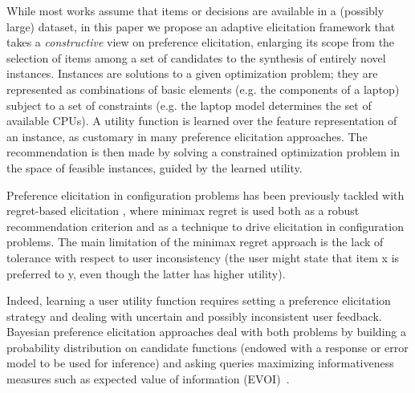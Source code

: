 \documentclass{article}
\renewcommand\[{\begin{equation}}
\renewcommand\]{\end{equation}}
\begin{document}


While most works assume that items or decisions are available in a (possibly large)
dataset, in this paper we propose an adaptive elicitation framework that takes a {\em constructive} view on preference
elicitation, enlarging its scope from the selection of items among a
set of candidates to the synthesis of entirely novel instances. 
Instances are solutions to a given optimization problem; they are represented as combinations of basic elements
(e.g. the components of a laptop) subject to a set of constraints
(e.g. the laptop model determines the set of available CPUs). 
A utility function is learned over the feature representation of an
instance, as customary in many preference elicitation approaches. 
The recommendation is then made by solving a constrained optimization
 problem in the space of feasible instances, guided by the learned
utility. 

Preference elicitation in configuration problems has been previously tackled with regret-based elicitation \cite{boutilier2006,braziunas2007}, where minimax regret is used both
as a robust recommendation criterion and as a technique to drive elicitation in configuration problems.
The main limitation of the minimax regret approach is the lack of tolerance with respect to user inconsistency (the user might state that item x is preferred to y, even though the latter has higher utility).

Indeed, learning a user utility function requires setting a preference
elicitation strategy and dealing with uncertain and possibly
inconsistent user feedback. 
Bayesian preference elicitation approaches
deal with both problems by building a probability distribution on
candidate functions (endowed with a response or error model to be used for inference) and asking queries maximizing informativeness
measures such as expected value of information (EVOI)~\cite{chajewska2000,guo2010real,viappiani2010optimal}. 
\end{document}
